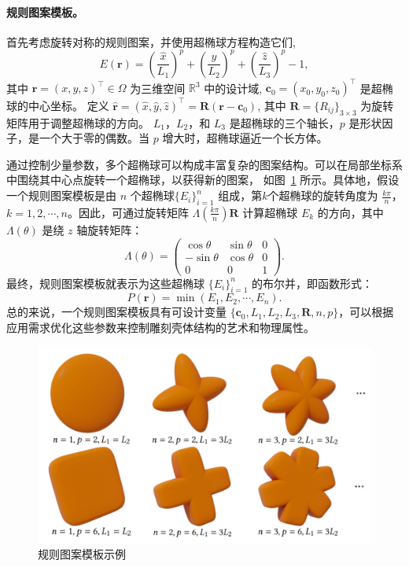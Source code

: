 \paragraph{规则图案模板。}首先考虑旋转对称的规则图案，并使用超椭球方程构造它们,
\begin{equation}
    \label{eq-ellipsoid}
    E(\mathbf{r})=\left(\frac{\hat{x}}{L_1}\right)^p+\left(\frac{\hat{y}}{L_2}\right)^p+\left(\frac{\hat{z}}{L_3}\right)^p-1,
\end{equation}
其中 $\mathbf{r}=(x, y, z)^\top\in\Omega$ 为三维空间 $\mathbb{R}^3$ 中的设计域,  $\mathbf{c}_0=(x_0,y_0,z_0)^\top$ 是超椭球的中心坐标。
定义 $\hat{\mathbf{r}}=(\hat{x}, \hat{y}, \hat{z})^\top=\mathbf{R}(\mathbf{r}-\mathbf{c}_0)$, 其中 $\mathbf{R}=\{R_{ij}\}_{3\times 3}$ 为旋转矩阵用于调整超椭球的方向。 $L_1$，$L_2$，和 $L_3$ 是超椭球的三个轴长，$p$ 是形状因子，是一个大于零的偶数。当 $p$ 增大时，超椭球逼近一个长方体。

通过控制少量参数，多个超椭球可以构成丰富复杂的图案结构。可以在局部坐标系中围绕其中心点旋转一个超椭球，以获得新的图案， 如图~\ref{fig-ellip} 所示。具体地，假设一个规则图案模板是由 $n$ 个超椭球$\{E_i\}_{i=1}^n$ 组成，第$k$个超椭球的旋转角度为 $\frac{k\pi}{n}$，$k=1,2,\cdots,n$。因此，可通过旋转矩阵 $\Lambda(\frac{k\pi}{n})\mathbf{R}$ 计算超椭球 $E_k$ 的方向，其中 $\Lambda(\theta)$ 是绕 $z$ 轴旋转矩阵：
\begin{equation}
    \Lambda(\theta)=
    \begin{pmatrix}
        \cos\theta & \sin\theta & 0 \\
        -\sin\theta & \cos\theta  & 0 \\
        0                  & 0                   & 1
    \end{pmatrix}.
\end{equation}
最终，规则图案模板就表示为这些超椭球 $\{E_i\}_{i=1}^n$ 的布尔并，即函数形式：
\begin{equation}
    P(\mathbf{r})=\min(E_1, E_2, \cdots, E_n).
\end{equation}
总的来说，一个规则图案模板具有可设计变量 $\{\mathbf{c}_0, L_1, L_2, L_3, \mathbf{R}, n, p\}$，可以根据应用需求优化这些参数来控制雕刻壳体结构的艺术和物理属性。
\begin{figure}[htbp]
    \centering
    \includegraphics[width=0.8\linewidth]{./figures/multi-ellips}
    \caption{规则图案模板示例}
    \label{fig-ellip}
\end{figure}

